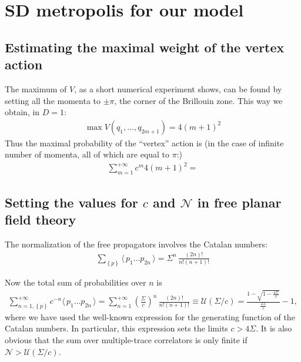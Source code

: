 \documentclass[12pt]{article}
\newcommand{\lr}[1]{ \left( #1 \right) }
\newcommand{\lrc}[1]{ \left\{ #1 \right\} }
\newcommand{\vev}[1]{ \langle \, #1 \, \rangle }
\begin{document}
\section{SD metropolis for our model}

\subsection{Estimating the maximal weight of the vertex action}

The maximum of $V$, as a short numerical experiment shows, can be found by setting all the momenta to $\pm \pi$, the corner of the Brillouin zone. This way we obtain, in $D=1$:
\begin{eqnarray}
\label{vertex_max}
 \max{V\lr{q_1, \ldots, q_{2m+1}}} = 4 \lr{m+1}^2
\end{eqnarray}
Thus the maximal probability of the ``vertex'' action is (in the case of infinite number of momenta, all of which are equal to $\pi$:)
\begin{eqnarray}
\label{vertex_max_prob}
 \sum\limits_{m=1}^{+\infty} c^m 4 \lr{m+1}^2 =
\end{eqnarray}

\subsection{Setting the values for $c$ and $\mathcal{N}$ in free planar field theory}

The normalization of the free propagators involves the Catalan numbers:
\begin{eqnarray}
\label{free_greenfunc_normalizations}
 \sum\limits_{\lrc{p}} \vev{p_1 \ldots p_{2n}} = \Sigma^n \, \frac{\lr{2 n}!}{n! \lr{n+1}!}
\end{eqnarray}

Now the total sum of probabilities over $n$ is
\begin{eqnarray}
\label{free_greenfunc_normalizations}
 \sum\limits_{n=1,\lrc{p}}^{+\infty} c^{-n} \vev{p_1 \ldots p_{2n}} 
 = 
 \sum\limits_{n=1}^{+\infty}
 \lr{\frac{\Sigma}{c}}^n \, \frac{\lr{2 n}!}{n! \lr{n+1}!}
 \equiv \mathcal{U}\lr{\Sigma/c} = 
 \frac{1 - \sqrt{1 - \frac{4 \Sigma}{c}}}{\frac{2 \Sigma}{c}} - 1 ,
\end{eqnarray}
where we have used the well-known expression for the generating function of the Catalan numbers. In particular, this expression sets the limits $c > 4 \Sigma$. It is also obvious that the sum over multiple-trace correlators is only finite if $\mathcal{N} > \mathcal{U}\lr{\Sigma/c} $.
\end{document}
